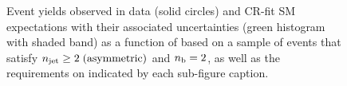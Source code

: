 \begin{figure}[h!]
\begin{center}
    \caption{Event yields observed in data (solid circles) and CR-fit SM expectations with their associated uncertainties (green histogram with shaded band) as a function of \HTmiss based on a sample of events that satisfy $n_{\text{jet}} \geq 2 \; \textrm{(asymmetric)}$ and $n_{\text{b}} = 2$, as well as the requirements on \scalht indicated by each sub-figure caption. }
    \label{fig:mhtval_ge2a_eq2b}
  \end{center}
\end{figure}

\begin{figure}[h!]
  \begin{center}
    \\

\end{center}
\end{figure}
